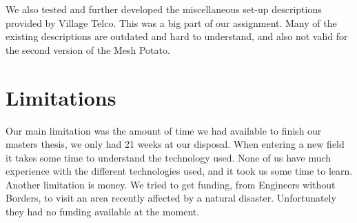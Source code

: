 We also tested and further developed the miscellaneous set-up descriptions provided by Village Telco. This was a big part of our assignment. Many of the existing descriptions are outdated and hard to understand, and also not valid for the second version of the Mesh Potato.



\section{Limitations}
Our main limitation was the amount of time we had available to finish our masters thesis, we only had 21 weeks at our disposal. When entering a new field it takes some time to understand the technology used. None of us have much experience with the different technologies used, and it took us some time to learn. Another limitation is money. We tried to get funding, from Engineers without Borders, to visit an area recently affected by a natural disaster. Unfortunately they had no funding available at the moment.


